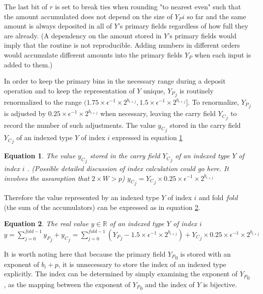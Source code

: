 \documentclass[12pt]{article}
\providecommand{\R}{\ensuremath{\mathbb{R}}}
\theoremstyle{plain}
\newtheorem{eq}{Equation}[section]
\begin{document}
      The last bit of $r$ is set to break ties when rounding "to nearest even" such that the amount accumulated does not depend on the size of ${Y_P}i$ so far and the same amount is always deposited in all of $Y$'s primary fields regardless of how full they are already. (A dependency on the amount stored in $Y$'s primary fields would imply that the routine is not reproducible. Adding numbers in different orders would accumulate different amounts into the primary fields $Y_P$ when each input is added to them.)

      In order to keep the primary bins in the necessary range during a deposit operation and to keep the representation of $Y$ unique, ${Y_P}_j$ is routinely renormalized to the range $(1.75 \times\epsilon^{-1} \times2^{b_{i + j}}, 1.5 \times\epsilon^{-1} \times2^{b_{i + j}}]$.
      To renormalize, ${Y_P}_j$ is adjusted by $0.25 \times\epsilon^{-1} \times 2^{b_{i + j}}$ when necessary, leaving the carry field ${Y_C}_j$ to record the number of such adjustments.
      The value ${y_C}_j$ stored in the carry field ${Y_C}_j$ of an indexed type $Y$ of index $i$ expressed in equation \ref{eq:car}
      \begin{eq} The value ${y_C}_j$ stored in the carry field ${Y_C}_j$ of an indexed type $Y$ of index $i$
. (Possible detailed discussion of index calculation could go here. It involves the assumption that $2\times W > p$)
        ${y_C}_j = {Y_C}_j \times 0.25\times\epsilon^{-1}\times2^{b_{i + j}}$
        \label{eq:car}
      \end{eq}
 Therefore the value represented by an indexed type $Y$ of index $i$ and fold $fold$ (the sum of the accumulators) can be expressed as in equation \ref{eq:indexedvalue}.
      \begin{eq} The real value $y \in \R$ of an indexed type $Y$ of index $i$
\
        $y = \sum\limits_{j = 0}^{fold - 1} {y_P}_j + {y_C}_j = \sum\limits_{j = 0}^{fold - 1} ({Y_P}_j - 1.5 \times\epsilon^{-1}\times 2^{b_{i + j}}) + {Y_C}_j \times 0.25\times\epsilon^{-1}\times2^{b_{i + j}}$
        \label{eq:indexedvalue}
      \end{eq}
      It is worth noting here that because the primary field ${Y_P}_0$ is stored with an exponent of $b_i + p$, it is unnecessary to store the index of an indexed type explicitly. The index can be determined by simply examining the exponent of ${Y_P}_0$, as the mapping between the exponent of ${Y_P}_0$ and the index of $Y$ is bijective.
\end{document}
